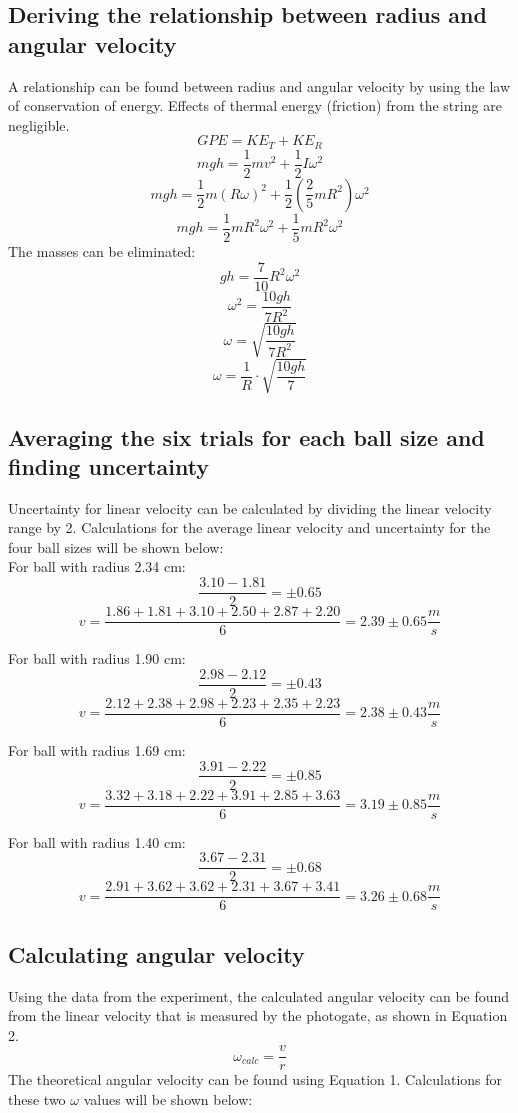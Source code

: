 \documentclass[10pt, letterpaper]{article}
\begin{document}
    \subsection{Deriving the relationship between radius and angular velocity} \label{sssec:derivation}

      A relationship can be found between radius and angular velocity by using the law of conservation of energy.
      Effects of thermal energy (friction) from the string are negligible.
      \[ GPE = KE_{T} + KE_{R}\]
      \[ mgh = \frac{1}{2}mv^2 + \frac{1}{2}I \omega ^2 \]
      \[ mgh = \frac{1}{2}m(R \omega )^2 + \frac{1}{2} \left( \frac{2}{5}mR^2 \right) \omega ^2 \]
      \[ mgh = \frac{1}{2}mR^{2} \omega ^2 + \frac{1}{5}mR^{2} \omega ^2 \]
      The masses can be eliminated:
      \[ gh = \frac{7}{10}R^2 \omega ^2 \]
      \[ \omega ^2 = \frac{10gh}{7R^2} \]
      \[ \omega = \sqrt{\frac{10gh}{7R^2}} \]
      \begin{equation}
        \boxed{ \omega = \frac{1}{R} \cdot \sqrt{\frac{10gh}{7}} }
      \end{equation}

    \subsection{Averaging the six trials for each ball size and finding uncertainty}
      Uncertainty for linear velocity can be calculated by dividing the linear velocity range by 2.
      Calculations for the average linear velocity and uncertainty for the four ball sizes will
      be shown below: \\

      For ball with radius 2.34 cm:
      \[ \frac{3.10 - 1.81}{2} = \pm 0.65  \]
      \[ v = \frac{1.86 + 1.81 + 3.10 + 2.50 + 2.87 + 2.20}{6} = 2.39 \pm 0.65 \frac{m}{s} \]

      For ball with radius 1.90 cm:
      \[ \frac{2.98 - 2.12}{2} = \pm 0.43  \]
      \[ v = \frac{2.12 + 2.38 + 2.98 + 2.23 + 2.35 + 2.23}{6} = 2.38 \pm 0.43 \frac{m}{s} \]

      For ball with radius 1.69 cm:
      \[ \frac{3.91 - 2.22}{2} = \pm 0.85  \]
      \[ v = \frac{3.32 + 3.18 + 2.22 + 3.91 + 2.85 + 3.63}{6} = 3.19 \pm 0.85 \frac{m}{s} \]

      For ball with radius 1.40 cm:
      \[ \frac{3.67 - 2.31}{2} = \pm 0.68  \]
      \[ v = \frac{2.91 + 3.62 + 3.62 + 2.31 + 3.67 + 3.41}{6} = 3.26 \pm 0.68 \frac{m}{s} \]


    \subsection{Calculating angular velocity}
      Using the data from the experiment, the calculated angular velocity can be found from
      the linear velocity that is measured by the photogate, as shown in Equation 2.
      \begin{equation}
        \omega _{calc} = \frac{v}{r}
      \end{equation}
      The theoretical angular velocity can be found using Equation 1. Calculations for these
      two $\omega $ values will be shown below: \\
\end{document}

